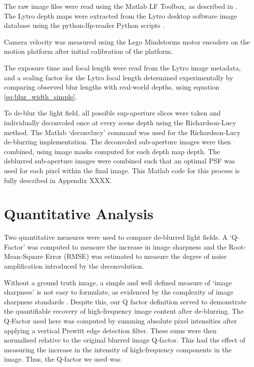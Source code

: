The raw image files were read using the Matlab LF Toolbox, as described in \cite{dansereau2013toolbox}.
The Lytro depth maps were extracted from the Lytro desktop software image database using the python-lfp-reader Python scripts \cite{esfahbod2013python}.

Camera velocity was measured using the Lego Mindstorms motor encoders on the motion platform after initial calibration of the platform.

The exposure time and focal length were read from the Lytro image metadata, and a scaling factor for the Lytro focal length determined experimentally by comparing observed blur lengths with real-world depths, using equation \ref{eq:blur_width_simple}.

To de-blur the light field, all possible sup-aperture slices were taken and individually deconvoled once at every scene depth using the Richardson-Lucy method.
The Matlab \enquote*{deconvlucy} command was used for the Richardson-Lucy de-blurring implementation.
The deconvoled sub-aperture images were then combined, using image masks computed for each depth map depth.
The deblurred sub-aperture images were combined such that an optimal PSF was used for each pixel within the final image.
This Matlab code for this process is fully described in Appendix XXXX.


\section{Quantitative Analysis}
\label{sec:quantitative_analysis}

Two quantitative measures were used to compare de-blurred light fields.
A \enquote*{Q-Factor} was computed to measure the increase in image sharpness and the Root-Mean-Square Error (RMSE) was estimated to measure the degree of noise amplification introduced by the deconvolution.

Without a ground truth image, a simple and well defined measure of \enquote*{image sharpness} is not easy to formulate, as evidenced by the complexity of image sharpness standards \cite{imatest2014sharpness}.
Despite this, our Q factor definition served to demonstrate the quantifiable recovery of high-frequency image content after de-blurring.
The Q-Factor used here was computed by summing absolute pixel intensities after applying a vertical Prewitt edge detection filter.
These sums were then normalised relative to the original blurred image Q-factor.
This had the effect of measuring the increase in the intensity of high-frequency components in the image.
Thus, the Q-factor we used was

